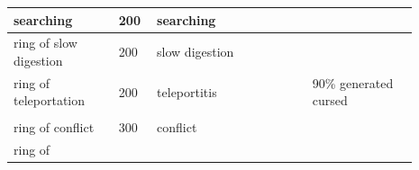 \begin{longtable}{|>{\RaggedRight}p{0.23487\linewidth}|>{\RaggedRight}p{0.07372\linewidth}|>{\RaggedRight}p{0.34225\linewidth}|>{\RaggedRight}p{0.23487\linewidth}|}
searching\footnotemark[89]&\hspace*{0pt}\ignorespaces{}\hspace*{0pt}200&\hspace*{0pt}\ignorespaces{}\hspace*{0pt}searching\footnotemark[90]&\hspace*{0pt}\ignorespaces{}\hspace*{0pt}\\ \hline \hspace*{0pt}\ignorespaces{}\hspace*{0pt}ring of slow digestion\footnotemark[91]&\hspace*{0pt}\ignorespaces{}\hspace*{0pt}200&\hspace*{0pt}\ignorespaces{}\hspace*{0pt}slow digestion\footnotemark[92]&\hspace*{0pt}\ignorespaces{}\hspace*{0pt}\\ \hline \hspace*{0pt}\ignorespaces{}\hspace*{0pt}ring of teleportation\footnotemark[93]&\hspace*{0pt}\ignorespaces{}\hspace*{0pt}200&\hspace*{0pt}\ignorespaces{}\hspace*{0pt}teleportitis\footnotemark[94]&\hspace*{0pt}\ignorespaces{}\hspace*{0pt}90\% generated cursed\\ \hline \multicolumn{4}{|>{\RaggedRight}p{0.97143\linewidth}|}{\hspace*{0pt}\ignorespaces{}\hspace*{0pt}}\\ \hline \hspace*{0pt}\ignorespaces{}\hspace*{0pt}ring of conflict\footnotemark[95]&\hspace*{0pt}\ignorespaces{}\hspace*{0pt}300&\hspace*{0pt}\ignorespaces{}\hspace*{0pt}conflict\footnotemark[96]&\hspace*{0pt}\ignorespaces{}\hspace*{0pt}\\ \hline \hspace*{0pt}\ignorespaces{}\hspace*{0pt}ring of 
\end{longtable}
